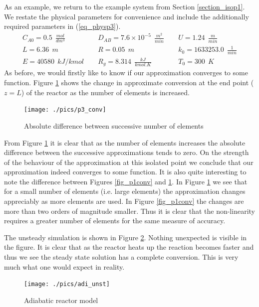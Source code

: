 \documentclass[11pt,fleqn]{article}
\theoremstyle{defstyle}
\begin{document}
As an example, we return to the example system from Section \ref{section_isop1}. We restate the physical parameters for convenience and include the additionally required parameters in (\ref{eq_physp3}).
\begin{equation}
\begin{matrix}
C_{A0} = 0.5~~ \frac{mol}{dm^3} & \phantom{-}D_{AB} = 7.6\times 10^{-5} ~~\frac{m^2}{min} & \phantom{-}U = 1.24~~ \frac{m}{min} \\
L = 6.36~~ m 
& \phantom{-} R = 0.05~~ m
& \phantom{-} k_0 = 1633253.0 ~~ \frac{1}{min} \\
E = 40580 ~~ kJ/kmol
& \phantom{-} R_g = 8.314~~ \frac{kJ}{kmol. K}
& \phantom{-} T_0 = 300 ~~ K
\end{matrix} 
\label{eq_physp3}
\end{equation}
As before, we would firstly like to know if our approximation converges to some function. Figure \ref{fig_p3conv} shows the change in approximate conversion at the end point ($z=L$) of the reactor as the number of elements is increased.
\begin{figure}[H] 
\centering
\texttt{[image: ./pics/p3\_conv]}
\caption{Absolute difference between successive number of elements} 
\label{fig_p3conv}
\end{figure}
From Figure \ref{fig_p3conv} it is clear that as the number of elements increases the absolute difference between the successive approximations tends to zero. On the strength of the behaviour of the approximation at this isolated point we conclude that our approximation indeed converges to some function. It is also quite interesting to note the difference between Figures \ref{fig_p1conv} and \ref{fig_p3conv}. In Figure \ref{fig_p3conv} we see that for a small number of elements (i.e. large elements) the approximation changes appreciably as more elements are used. In Figure \ref{fig_p1conv} the changes are more than two orders of magnitude smaller. Thus it is clear that the non-linearity requires a greater number of elements for the same measure of accuracy. 

The unsteady simulation is shown in Figure \ref{fig_adi_unst}. Nothing unexpected is visible in the figure. It is clear that as the reactor heats up the reaction becomes faster and thus we see the steady state solution has a complete conversion. This is very much what one would expect in reality.
\begin{figure}[H] 
\centering
\texttt{[image: ./pics/adi\_unst]}
\caption{Adiabatic reactor model} 
\label{fig_adi_unst}
\end{figure}
\end{document}
